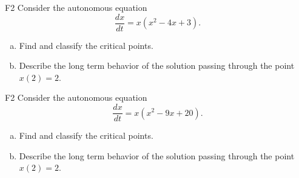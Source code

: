\begin{problem}{F2}
Consider the autonomous equation
\[
\frac{dx}{dt} = x(x^2 - 4x + 3).
\]
\begin{enumerate}[(a)]
\item Find and classify the critical points.
\item Describe the long term behavior of the solution passing through the point \(x(2)=2\).
\end{enumerate}
\end{problem}

\begin{problem}{F2}
Consider the autonomous equation
\[
\frac{dx}{dt} = x(x^2 - 9x + 20).
\]
\begin{enumerate}[(a)]
\item Find and classify the critical points.
\item Describe the long term behavior of the solution passing through the point \(x(2)=2\).
\end{enumerate}
\end{problem}

